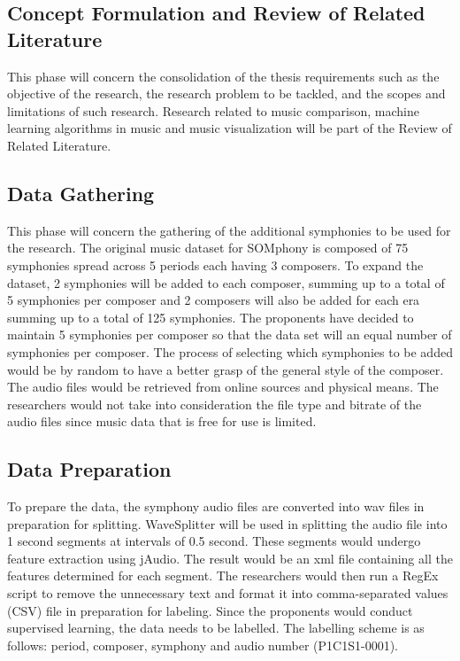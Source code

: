 \subsection{Concept Formulation and Review of Related Literature}
This phase will concern the consolidation of the thesis requirements such as the objective of the research, the research problem to be tackled, and the scopes and limitations of such research. Research related to music comparison, machine learning algorithms in music and music visualization will be part of the Review of Related Literature.

\subsection{Data Gathering}
This phase will concern the gathering of the additional symphonies to be used for the research. The original music dataset for SOMphony is composed of 75 symphonies spread across 5 periods each having 3 composers. To expand the dataset, 2 symphonies will be added to each composer, summing up to a total of 5 symphonies per composer and 2 composers will also be added for each era summing up to a total of 125 symphonies. The proponents have decided to maintain 5 symphonies per composer so that the data set will an equal number of symphonies per composer. The process of selecting which symphonies to be added would be by random to have a better grasp of the general style of the composer. The audio files would be retrieved from online sources and physical means. The researchers would not take into consideration the file type and bitrate of the audio files since music data that is free for use is limited.

\subsection{Data Preparation}
To prepare the data, the symphony audio files are converted into wav files in preparation for splitting. WaveSplitter will be used in splitting the audio file into 1 second segments at intervals of 0.5 second. These segments would undergo feature extraction using jAudio. The result would be an xml file containing all the features determined for each segment. The researchers would then run a RegEx script to remove the unnecessary text and format it into comma-separated values (CSV) file in preparation for labeling. Since the proponents would conduct supervised learning, the data needs to be labelled. The labelling scheme is as follows: period, composer, symphony and audio number (P1C1S1-0001). 

